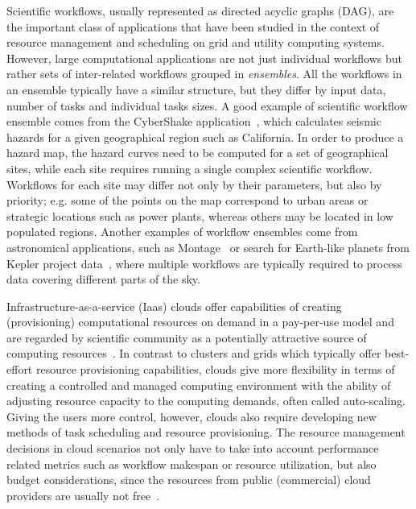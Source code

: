 \documentclass{sig-alternate}
\begin{document}
Scientific workflows, usually represented as directed acyclic graphs (DAG), are
the important class of applications that have been studied in the context of
resource management and scheduling on grid and utility computing systems.
However, large computational applications are not just individual workflows but
rather sets of inter-related workflows grouped in {\em ensembles}. All the
workflows in an ensemble typically have a similar structure, but they differ by
input data, number of tasks and individual tasks sizes. A good example of
scientific workflow ensemble comes from the CyberShake
application~\cite{Callaghan11}, which calculates seismic hazards for a given
geographical region such as California. In order to produce a hazard map, the
hazard curves need to be computed for a set of geographical sites, while each
site requires running a single complex scientific workflow. Workflows for each
site may differ not only by their parameters, but also by priority; e.g. some of
the points on the map correspond to urban areas or strategic locations such as
power plants, whereas others may be located in low populated regions. Another
examples of workflow ensembles come from astronomical applications, such as
Montage~\cite{Deelman08} or search for Earth-like planets from Kepler project
data~\cite{vockler11}, where multiple workflows are typically required to
process data covering different parts of the sky.
 
Infrastructure-as-a-service (Iaas) clouds offer capabilities of creating
(provisioning) computational resources on demand in a pay-per-use model and are regarded by
scientific community as a potentially attractive source of computing
resources~\cite{Ostermann10,Keahey09}. In contrast to clusters and grids which
typically offer best-effort resource provisioning capabilities, clouds give more
flexibility in terms of creating a controlled and managed computing environment
with the ability of adjusting resource capacity to the computing demands, often
called auto-scaling. Giving the users more control, however, clouds also require
developing new methods of task scheduling and resource provisioning. The
resource management decisions in cloud scenarios not only have to take into
account performance related metrics such as workflow makespan or resource
utilization, but also budget considerations, since the resources from public
(commercial) cloud providers are usually not free~\cite{Durkee10}.
\end{document}

